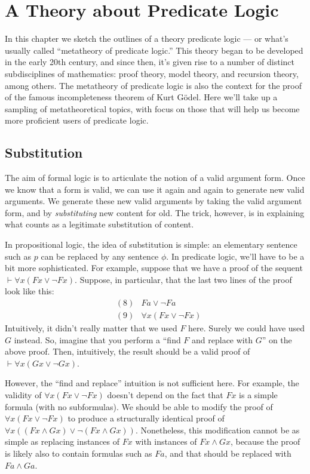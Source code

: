 \chapter{A Theory about Predicate Logic} \label{meta2}

In this chapter we sketch the outlines of a theory predicate logic ---
or what's usually called ``metatheory of predicate logic.''  This
theory began to be developed in the early 20th century, and since
then, it's given rise to a number of distinct subdisciplines of
mathematics: proof theory, model theory, and recursion theory, among
others.  The metatheory of predicate logic is also the context for the
proof of the famous incompleteness theorem of Kurt G{\"o}del.  Here
we'll take up a sampling of metatheoretical topics, with focus on
those that will help us become more proficient users of predicate
logic.

\section{Substitution}

The aim of formal logic is to articulate the notion of a valid
argument form.  Once we know that a form is valid, we can use it again
and again to generate new valid arguments.  We generate these new
valid arguments by taking the valid argument form, and by {\it
  substituting} new content for old.  The trick, however, is in
explaining what counts as a legitimate substitution of content.

In propositional logic, the idea of substitution is simple: an
elementary sentence such as $p$ can be replaced by any sentence
$\phi$.  In predicate logic, we'll have to be a bit more
sophisticated.  For example, suppose that we have a proof of the sequent
$\vdash \forall x(Fx\vee\neg Fx)$.  Suppose, in particular, that the
last two lines of the proof look like this:
\[ \begin{array}{llll}
     & (8) & Fa\vee \neg Fa  \\
     & (9) & \forall x(Fx\vee \neg Fx) \end{array} \] %
Intuitively, it didn't really matter that we used $F$ here.  Surely
we could have used $G$ instead.  So, imagine that you perform a
``find $F$ and replace with $G$'' on the above proof.  Then,
intuitively, the result should be a valid proof of
$\vdash \forall x(Gx\vee\neg Gx)$.

However, the ``find and replace'' intuition is not sufficient here.
For example, the validity of $\forall x(Fx\vee\neg Fx)$ doesn't depend
on the fact that $Fx$ is a simple formula (with no subformulas).  We
should be able to modify the proof of $\forall x(Fx\vee\neg Fx)$ to
produce a structurally identical proof of
$\forall x((Fx\wedge Gx)\vee \neg (Fx\wedge Gx))$.  Nonetheless, this
modification cannot be as simple as replacing instances of $Fx$ with
instances of $Fx\wedge Gx$, because the proof is likely also to
contain formulas such as $Fa$, and that should be replaced with
$Fa\wedge Ga$.

